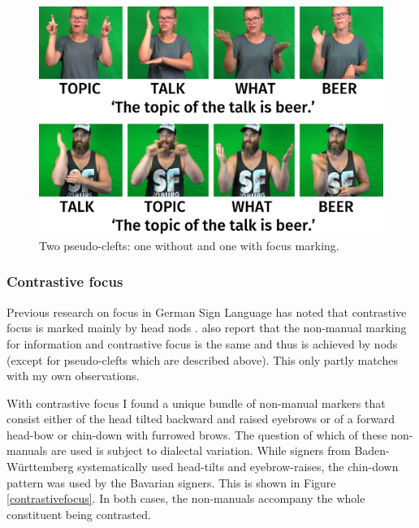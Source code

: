 \begin{figure}[bt]
\centering
	\includegraphics[width=1.0\textwidth]{pseudoclefttwo.jpg}
	\caption{Two pseudo-clefts: one without and one with focus marking.}
	\label{pseudocleft}
\end{figure}

\subsubsection{Contrastive focus}\label{contrastivefocussubection}
Previous research on focus in German Sign Language has noted that contrastive focus is marked mainly by head nods \citep{waleschkowski2009}. \citet[402--403]{happ2014vork} also report that the non-manual marking for information and contrastive focus is the same and thus is achieved by nods (except for pseudo-clefts which are described above). This only partly matches with my own observations. 

With contrastive focus I found a unique bundle of non-manual markers that consist either of the head tilted backward and raised eyebrows or of a forward head-bow or chin-down with furrowed brows. The question of which of these non-manuals are used is subject to dialectal variation. While signers from Baden-Württemberg systematically used head-tilts and eyebrow-raises, the chin-down pattern was used by the Bavarian signers. This is shown in Figure \ref{contrastivefocus}. In both cases, the non-manuals accompany the whole constituent being contrasted.

